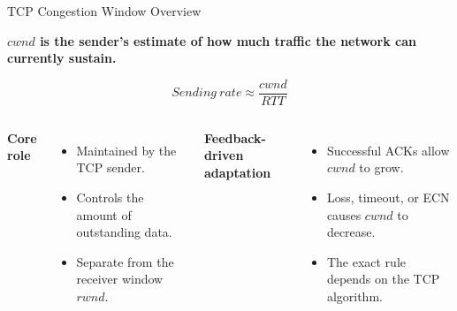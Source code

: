 \begin{frame}{TCP Congestion Window Overview}

\begin{center}
\textbf{$cwnd$ is the sender's estimate of how much traffic the network can currently sustain.}
\end{center}

\[
\boxed{Sending\ rate \approx \frac{cwnd}{RTT}}
\]

\begin{columns}[T,onlytextwidth]
\textbf{Core role}
\begin{itemize}
    \item Maintained by the TCP sender.
    \item Controls the amount of outstanding data.
    \item Separate from the receiver window $rwnd$.
\end{itemize}

\textbf{Feedback-driven adaptation}
\begin{itemize}
    \item Successful ACKs allow $cwnd$ to grow.
    \item Loss, timeout, or ECN causes $cwnd$ to decrease.
    \item The exact rule depends on the TCP algorithm.
\end{itemize}
\end{columns}

\vspace{-0.12cm}
\begin{center}
\end{center}

\end{frame}
